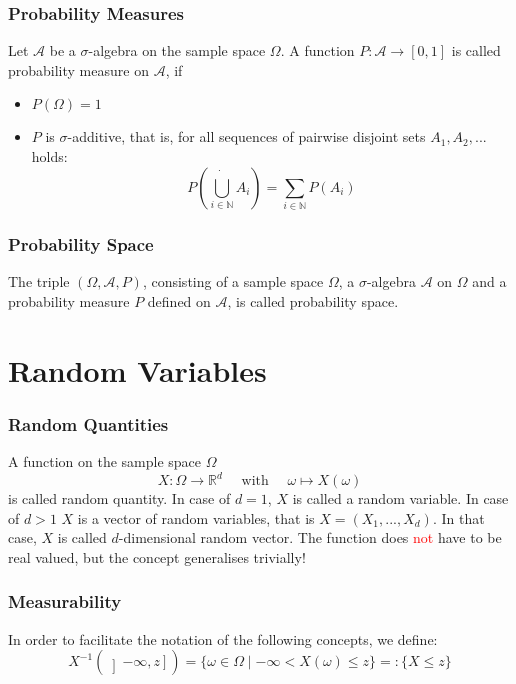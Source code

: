 \documentclass{beamer}
\begin{document}
\begin{frame}
\frametitle{Probability Measures}

Let $\mathscr{A}$ be a $\sigma$-algebra on the sample space $\Omega$. A function $P : \mathscr{A} \to [0, 1]$ is called probability measure
on $\mathscr{A}$, if
\begin{itemize}
\pause
\item{$P(\Omega) = 1$}
\pause
\item{$P$ is $\sigma$-additive, that is, for all sequences of pairwise disjoint sets $A_1, A_2, . . .$ holds: \[
P\left( \dot{\bigcup\limits_{i \in \mathbb{N}}}A_i \right) = \sum_{i \in \mathbb{N}}P(A_i)
\]}
\end{itemize}

\end{frame}


\begin{frame}
\frametitle{Probability Space}

The triple $(\Omega, \mathscr{A}, P)$, consisting of a sample space $\Omega$, a $\sigma$-algebra $\mathscr{A}$ on $\Omega$ and a probability measure $P$ defined on $\mathscr{A}$, is called probability space.

\end{frame}


\section{Random Variables} 


\begin{frame}
\frametitle{Random Quantities}

A function on the sample space $\Omega$ \[
X : \Omega \to \mathbb{R}^d \quad \text{  with  }\quad \omega \mapsto X(\omega)
\]
is called random quantity. \newline
\pause
In case of $d=1$, $X$ is called a random variable. \newline
\pause
In case of $d>1$ $X$ is a vector of random variables, that is $X = (X_1, . . . , X_d)$. In that case, $X$ is called $d$-dimensional random vector. \newline
\pause
The function does \textcolor{red}{not} have to be real valued, but the concept generalises trivially!

\end{frame}


\begin{frame}
\frametitle{Measurability}

In order to facilitate the notation of the following concepts, we define:
\[
X^{-1}(\left] -\infty, z \right] ) = \{ \omega \in \Omega \mid -\infty < X(\omega) \leq z \} =: \{ X \leq z \}
\]

\end{frame}
\end{document}
